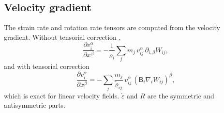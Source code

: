 \documentclass[10pt,fleqn,twoside]{article}
\newcommand{\gradW}{\nabla_{\!i} W_{ij}}
\begin{document}
\subsection{Velocity gradient}
The strain rate and rotation rate tensors are computed from the velocity gradient. Without tensorial correction
\citep{benz:1995},
\begin{equation}
 \frac{\partial v_i^\alpha}{\partial x^\beta} = -\frac{1}{\varrho_i}\sum_j m_j\,v_{ij}^\alpha\,\partial_{i,\beta} W_{ij},
\end{equation}
and with tensorial correction
\begin{equation}
 \frac{\partial v_i^\alpha}{\partial x^\beta} = -\sum_j \frac{m_j}{\tilde\varrho_{ij}}\,v_{ij}^\alpha\,
   \left(\mathsf B_i\gradW\right)^\beta,
\end{equation}
which is exact for linear velocity fields. $\dot\varepsilon$ and $R$ are the symmetric and antisymmetric parts.
\end{document}
